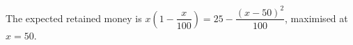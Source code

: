 The expected retained money is $x(1-\dfrac{x}{100})=25-\dfrac{(x-50)^2}{100}$, maximised at $\boxed{x=50}$.
